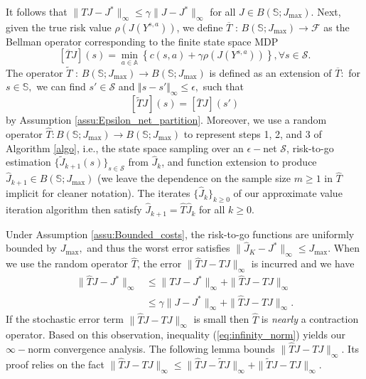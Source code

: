 \documentclass[12pt,technote,onecolumn]{IEEEtran}
\begin{document}
It follows that $\|TJ-J^{*}\|_{\infty}\leq\gamma\|J-J^{*}\|_{\infty}$
for all $J\in B\left(\mathbb{S};J_{\max}\right)$. Next, given the
true risk value $\rho(J(Y^{s,a}))$, we define
$\overline{T}\mbox{ : }B\left(\mathbb{S};J_{\max}\right)\rightarrow \mathcal{F}$
as the Bellman operator corresponding to the finite state space MDP
\[
\left[\overline{T}J\right]\left(s\right)=\min_{a\in\mathbb{A}}\left\{ c(s,a)+\gamma\rho\left(J\left(Y^{s,a}\right)\right)\right\},\forall s\in\mathcal{S}.
\]
The operator $\widetilde{T}\mbox{ : }B\left(\mathbb{S};J_{\max}\right)\rightarrow B\left(\mathbb{S};J_{\max}\right)$
is defined as an extension of $\overline{T}:$ for $s\in\mathbb{S},$
we can find $s'\in\mathcal{S}$ and $\Vert s-s'\Vert _{\infty}\leq\epsilon,$
such that
$$
[\widetilde{T}J](s)=[\overline{T}J](s')
$$
by Assumption \ref{assu:Epsilon_net_partition}. Moreover, we use
a random operator $\widehat{T}: B\left(\mathbb{S};J_{\max}\right)\rightarrow B\left(\mathbb{S};J_{\max}\right)$ to represent steps 1, 2, and 3 of
Algorithm \ref{algo}, i.e., the state space sampling over an $\epsilon-$net $\mathcal{S}$,
risk-to-go estimation $\{ \widetilde{J}_{k+1}\left(s\right)\} _{s\in\mathcal{S}}$
from $\hat{J}_{k}$, and function extension to produce $\widehat{J}_{k+1}\in B\left(\mathbb{S};J_{\max}\right)$
(we leave the dependence on the sample size $m\geq1$ in $\widehat{T}$
implicit for cleaner notation). The iterates $\{ \widehat{J}_{k}\} _{k\geq0}$
of our approximate value iteration algorithm then satisfy $\widehat{J}_{k+1}=\widehat{T}\widehat{J}_{k}$
for all $k\geq0$. 

Under Assumption \ref{assu:Bounded_costs}, the risk-to-go functions
are uniformly bounded by $J_{\max},$ and thus the worst error satisfies
$
\|\widehat{J}_{K}-J^{*}\|_{\infty}\leq J_{\max}.
$
When we use the random operator $\widehat{T}$, the error $\|\widehat{T}J-TJ\|_{\infty}$
is incurred and we have 
\begin{equation}
\begin{aligned}
\|\widehat{T}J-J^{*}\|_{\infty}&\leq\|TJ-J^{*}\|_{\infty}+\|\widehat{T}J-TJ\|_{\infty}\\
&\leq\gamma\|J-J^{*}\|_{\infty}+\|\widehat{T}J-TJ\|_{\infty}.\label{eq:infinity_norm}
\end{aligned}
\end{equation}
If the stochastic error term $\|\widehat{T}J-TJ\|_{\infty}$ is
small then $\widehat{T}$ is \textit{nearly} a contraction operator.
Based on this observation, inequality (\ref{eq:infinity_norm}) yields
our $\infty-$norm convergence analysis. The following lemma bounds
$\|\widehat{T}J-TJ\|_{\infty}.$ Its proof relies on the fact
$\|\widehat{T}J-TJ\|_{\infty}\leq\|\widehat{T}J-\widetilde{T}J\|_{\infty}+\|\widetilde{T}J-TJ\|_{\infty}.$
\end{document}
